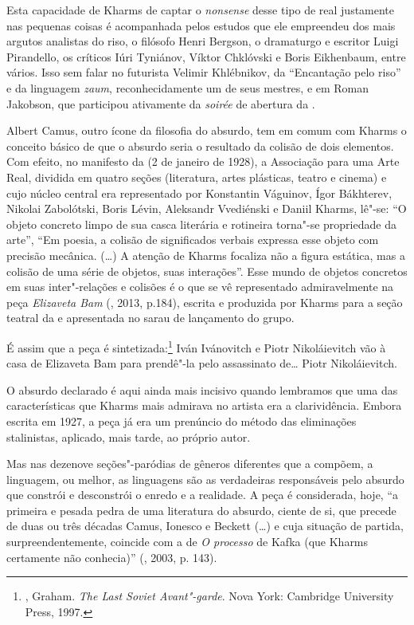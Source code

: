 Esta capacidade de Kharms de captar o \emph{nonsense} desse tipo de real
justamente nas pequenas coisas é acompanhada pelos estudos que ele
empreendeu dos mais argutos analistas do riso, o filósofo Henri Bergson,
o dramaturgo e escritor Luigi Pirandello, os críticos Iúri Tyniánov,
Víktor Chklóvski e Boris Eikhenbaum, entre vários. Isso sem falar no
futurista Velimir Khlébnikov, da ``Encantação pelo riso'' e da linguagem
\emph{zaum}, reconhecidamente um de seus mestres, e em Roman Jakobson,
que participou ativamente da \emph{soirée} de abertura da
.

Albert Camus, outro ícone da filosofia do absurdo, tem em comum com
Kharms o conceito básico de que o absurdo seria o resultado da colisão
de dois elementos. Com efeito, no manifesto da  (2 de
janeiro de 1928), a Associação para uma Arte Real, dividida em quatro
seções (literatura, artes plásticas, teatro e cinema) e cujo núcleo
central era representado por Konstantin Váguinov, Ígor Bákhterev,
Nikolai Zabolótski, Boris Lévin, Aleksandr Vvediénski e Daniil Kharms,
lê"-se: ``O objeto concreto limpo de sua casca literária e rotineira
torna"-se propriedade da arte'', ``Em poesia, a colisão de
significados verbais expressa esse objeto com precisão mecânica.
(\ldots{}) A atenção de Kharms focaliza não a figura estática, mas a
colisão de uma série de objetos, suas interações''. Esse mundo de
objetos concretos em suas inter"-relações e colisões é o que se vê
representado admiravelmente na peça \emph{Elizaveta Bam} (, 2013, p.184), escrita
e produzida por Kharms para a seção teatral da  e
apresentada no sarau de lançamento do grupo.

É assim que a peça é sintetizada:\footnote{, Graham. \emph{The Last Soviet Avant"-garde}. Nova York: Cambridge University Press, 1997.} Iván Ivánovitch e Piotr Nikoláievitch vão à casa de Elizaveta Bam para
prendê"-la pelo assassinato de\ldots{} Piotr Nikoláievitch.

O absurdo declarado é aqui ainda mais incisivo quando lembramos que uma
das características que Kharms mais admirava no artista era a
clarividência. Embora escrita em 1927, a peça já era um prenúncio do
método das eliminações stalinistas, aplicado, mais tarde, ao próprio
autor.

Mas nas dezenove seções"-paródias de gêneros diferentes que a compõem, a
linguagem, ou melhor, as linguagens são as verdadeiras responsáveis pelo
absurdo que constrói e desconstrói o enredo e a realidade. A peça é
considerada, hoje, ``a primeira e pesada pedra de uma literatura do
absurdo, ciente de si, que precede de duas ou
três décadas Camus, Ionesco e Beckett (\ldots{}) e cuja situação de
partida, surpreendentemente, coincide com a de \emph{O processo}
de Kafka (que Kharms certamente não conhecia)'' (, 2003, p. 143).

